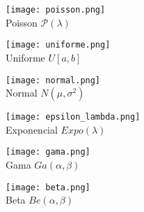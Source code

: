 \begin{figure}[H]
\begin{subfigure}[t]{.475\textwidth}\texttt{[image: poisson.png]}\centering\\Poisson $\mathcal{P}(\lambda)$
\end{subfigure}\qquad
\begin{subfigure}[t]{.475\textwidth}\texttt{[image: uniforme.png]}\centering\\Uniforme $U[a,b]$
\end{subfigure}
\end{figure}

\begin{figure}[H]
\begin{subfigure}[t]{.475\textwidth}\texttt{[image: normal.png]}\centering\\Normal $N(\mu,\sigma^2)$
\end{subfigure}\qquad
\begin{subfigure}[t]{.475\textwidth}\texttt{[image: epsilon\_lambda.png]}\centering\\Exponencial $Expo(\lambda)$
\end{subfigure}
\end{figure}

\begin{figure}[H]
\begin{subfigure}[t]{.475\textwidth}\texttt{[image: gama.png]}\centering\\Gama $Ga(\alpha,\beta)$
\end{subfigure}\qquad
\begin{subfigure}[t]{.475\textwidth}\texttt{[image: beta.png]}\centering\\Beta $Be(\alpha,\beta)$
\end{subfigure}
\end{figure}